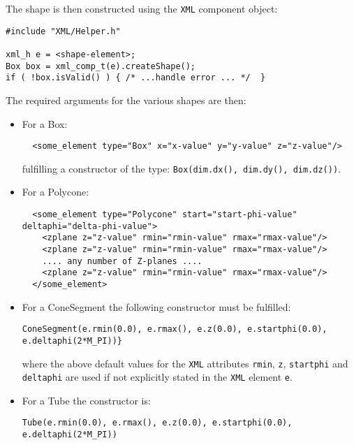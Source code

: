 The shape is then constructed using the \texttt{XML} component object:
\begin{verbatim}
#include "XML/Helper.h"

xml_h e = <shape-element>;
Box box = xml_comp_t(e).createShape();
if ( !box.isValid() ) { /* ...handle error ... */  }
\end{verbatim}
The required arguments for the various shapes are then:
\begin{itemize}
\item For a Box:
\begin{verbatim}
  <some_element type="Box" x="x-value" y="y-value" z="z-value"/>
\end{verbatim}
fulfilling a constructor of the type: \texttt{Box(dim.dx(), dim.dy(), dim.dz())}.

\item For a Polycone:
\vspace{-0.2cm}
\begin{verbatim}
  <some_element type="Polycone" start="start-phi-value" deltaphi="delta-phi-value">
    <zplane z="z-value" rmin="rmin-value" rmax="rmax-value"/>
    <zplane z="z-value" rmin="rmin-value" rmax="rmax-value"/>
    .... any number of Z-planes ....
    <zplane z="z-value" rmin="rmin-value" rmax="rmax-value"/>
  </some_element>
\end{verbatim}

\item For a ConeSegment the following constructor must be fulfilled: 
\begin{verbatim}
ConeSegment(e.rmin(0.0), e.rmax(), e.z(0.0), e.startphi(0.0), e.deltaphi(2*M_PI))}
\end{verbatim}
where the above default values for the \texttt{XML} attributes \texttt{rmin}, \texttt{z}, \texttt{startphi} and \texttt{deltaphi} are used if not explicitly stated in the \texttt{XML} element \texttt{e}.

\item For a Tube the constructor is:
\begin{verbatim}
Tube(e.rmin(0.0), e.rmax(), e.z(0.0), e.startphi(0.0), e.deltaphi(2*M_PI))
\end{verbatim}


\end{itemize}
